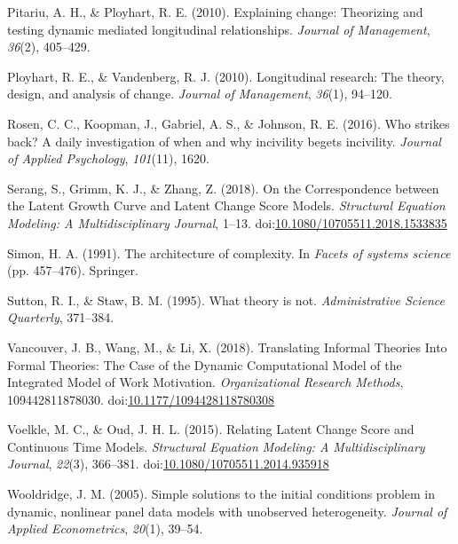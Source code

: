 \documentclass[english,,man]{apa6}
\theoremstyle{definition}
\theoremstyle{definition}
\theoremstyle{definition}
\theoremstyle{remark}
\begin{document}
\leavevmode\hypertarget{ref-pitariu_explaining_2010}{}%
Pitariu, A. H., \& Ployhart, R. E. (2010). Explaining change: Theorizing
and testing dynamic mediated longitudinal relationships. \emph{Journal
of Management}, \emph{36}(2), 405--429.

\leavevmode\hypertarget{ref-ployhart_longitudinal_2010}{}%
Ployhart, R. E., \& Vandenberg, R. J. (2010). Longitudinal research: The
theory, design, and analysis of change. \emph{Journal of Management},
\emph{36}(1), 94--120.

\leavevmode\hypertarget{ref-rosen_who_2016}{}%
Rosen, C. C., Koopman, J., Gabriel, A. S., \& Johnson, R. E. (2016). Who
strikes back? A daily investigation of when and why incivility begets
incivility. \emph{Journal of Applied Psychology}, \emph{101}(11), 1620.

\leavevmode\hypertarget{ref-serang_correspondence_2018}{}%
Serang, S., Grimm, K. J., \& Zhang, Z. (2018). On the Correspondence
between the Latent Growth Curve and Latent Change Score Models.
\emph{Structural Equation Modeling: A Multidisciplinary Journal}, 1--13.
doi:\href{https://doi.org/10.1080/10705511.2018.1533835}{10.1080/10705511.2018.1533835}

\leavevmode\hypertarget{ref-simon1991architecture}{}%
Simon, H. A. (1991). The architecture of complexity. In \emph{Facets of
systems science} (pp. 457--476). Springer.

\leavevmode\hypertarget{ref-sutton1995theory}{}%
Sutton, R. I., \& Staw, B. M. (1995). What theory is not.
\emph{Administrative Science Quarterly}, 371--384.

\leavevmode\hypertarget{ref-vancouver_translating_2018}{}%
Vancouver, J. B., Wang, M., \& Li, X. (2018). Translating Informal
Theories Into Formal Theories: The Case of the Dynamic Computational
Model of the Integrated Model of Work Motivation. \emph{Organizational
Research Methods}, 109442811878030.
doi:\href{https://doi.org/10.1177/1094428118780308}{10.1177/1094428118780308}

\leavevmode\hypertarget{ref-voelkle_relating_2015}{}%
Voelkle, M. C., \& Oud, J. H. L. (2015). Relating Latent Change Score
and Continuous Time Models. \emph{Structural Equation Modeling: A
Multidisciplinary Journal}, \emph{22}(3), 366--381.
doi:\href{https://doi.org/10.1080/10705511.2014.935918}{10.1080/10705511.2014.935918}

\leavevmode\hypertarget{ref-wooldridge2005simple}{}%
Wooldridge, J. M. (2005). Simple solutions to the initial conditions
problem in dynamic, nonlinear panel data models with unobserved
heterogeneity. \emph{Journal of Applied Econometrics}, \emph{20}(1),
39--54.
\end{document}
